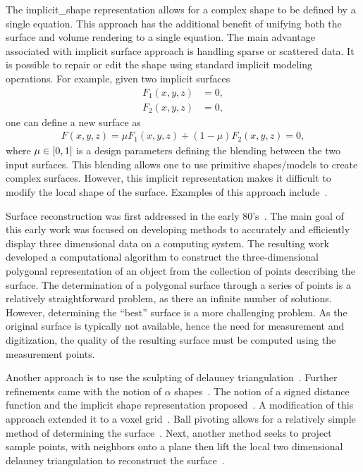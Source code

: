 
The \gls{implicit_shape} representation allows for a complex shape to be defined by a single equation.
This approach has the additional benefit of unifying both the surface and volume rendering to a single equation.
The main advantage associated with implicit surface approach is handling sparse or scattered data.
It is possible to repair or edit the shape using standard implicit modeling operations.
For example, given two implicit surfaces
\begin{align*}
    F_1(x, y, z) &= 0, \\
    F_2(x, y, z) &= 0 ,
\end{align*}
one can define a new surface as
\begin{align*}
    F(x, y, z) = \mu F_1(x, y, z) + (1-\mu) F_2(x,y,z) = 0,
\end{align*}
where \( \mu \in \left[ 0, 1 \right]\) is a design parameters defining the blending between the two input surfaces.
This blending allows one to use primitive shapes/models to create complex surfaces.
However, this implicit representation makes it difficult to modify the local shape of the surface. 
Examples of this approach include~\cite{bolitho2009,hoppe1992,ohtake2005}.

Surface reconstruction was first addressed in the early 80's~\cite{uselton1983,uselton1981}.
The main goal of this early work was focused on developing methods to accurately and efficiently display three dimensional data on a computing system.
The resulting work developed a computational algorithm to construct the three-dimensional polygonal representation of an object from the collection of points describing the surface.
The determination of a polygonal surface through a series of points is a relatively straightforward problem, as there an infinite number of solutions.
However, determining the ``best'' surface is a more challenging problem.
As the original surface is typically not available, hence the need for measurement and digitization, the quality of the resulting surface must be computed using the measurement points.

Another approach is to use the sculpting of delauney triangulation~\cite{boissonnat1984}.
Further refinements came with the notion of \( \alpha \) shapes~\cite{edelsbrunner1994}.
The notion of a signed distance function and the implicit shape representation proposed~\cite{hoppe1992}.
A modification of this approach extended it to a voxel grid~\cite{curless1996}.
Ball pivoting allows for a relatively simple method of determining the surface~\cite{bernardini1999}.
Next, another method seeks to project sample points, with neighbors onto a plane then lift the local two dimensional delauney triangulation to reconstruct the surface~\cite{gopi2000}.

